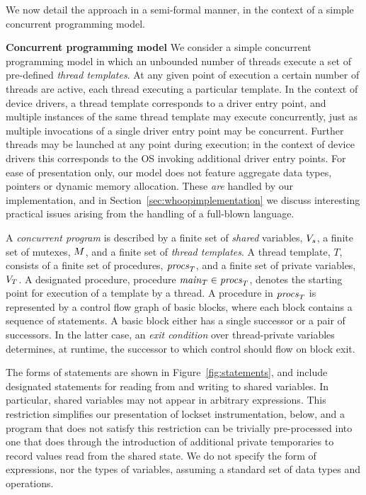 We now detail the approach in a semi-formal manner, in the context of a simple concurrent programming model.

\medskip\noindent\textbf{Concurrent programming model }
%
We consider a simple concurrent programming model in which an
unbounded number of threads execute a set of pre-defined \emph{thread
  templates}.  At any given point of execution a certain number of
threads are active, each thread executing a particular template.  In
the context of device drivers, a thread template corresponds to a
driver entry point, and multiple instances of the same thread template
may execute concurrently, just as multiple invocations of a single
driver entry point may be concurrent.  Further threads may be launched
at any point during execution; in the context of device drivers this
corresponds to the OS invoking additional driver entry points.  For
ease of presentation only, our model does not feature aggregate data
types, pointers or dynamic memory allocation.  These \emph{are}
handled by our implementation, and in
Section~\ref{sec:whoopimplementation} we discuss interesting practical
issues arising from the handling of a full-blown language.

A \emph{concurrent program} is described by a finite set of
\emph{shared} variables, $V_s$, a finite set of mutexes,
$M$, and a finite set of \emph{thread templates}.  A thread
template, $T$, consists of a finite set of procedures,
$\mathit{procs}_{T}$, and a finite set of private variables,
$V_{T}$.  A designated procedure, procedure $\mathit{main}_{T}
\in \mathit{procs}_{T}$, denotes the starting point for execution of a
template by a thread.  A procedure in $\mathit{procs}_{T}$ is
represented by a control flow graph of basic blocks, where each block
contains a sequence of statements.  A basic block either has a single
successor or a pair of successors.  In the latter case, an \emph{exit
  condition} over thread-private variables determines, at runtime, the
successor to which control should flow on block exit.

The forms of statements are shown in Figure~\ref{fig:statements}, and
include designated statements for reading from and writing to shared
variables.  In particular, shared variables may not appear in
arbitrary expressions.  This restriction simplifies our presentation
of lockset instrumentation, below, and a program that does not satisfy
this restriction can be trivially pre-processed into one that does
through the introduction of additional private temporaries to record
values read from the shared state.  We do not specify the form of
expressions, nor the types of variables, assuming a standard set of
data types and operations.


